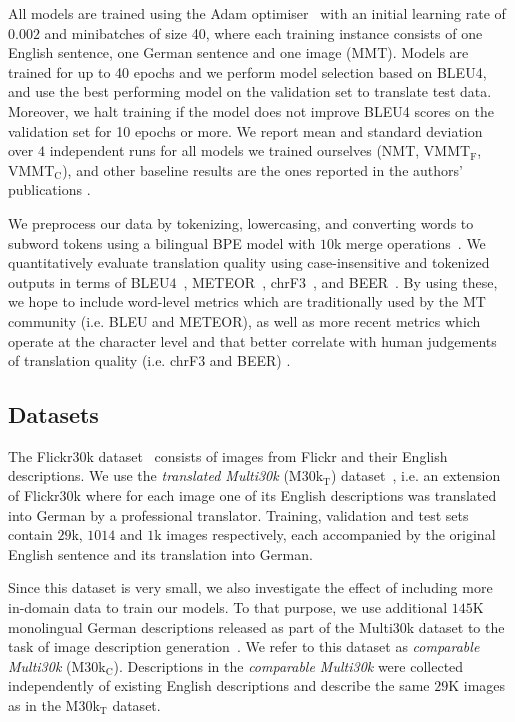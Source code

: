 \documentclass[11pt,a4paper]{article}
\newcommand{\cond}{VMMT$_{\text{C}}$\xspace}
\newcommand{\uncond}{VMMT$_{\text{F}}$\xspace}
\begin{document}
All models are trained using the Adam optimiser~\cite{KingmaBa2014} with an initial learning rate of $0.002$ and minibatches of size 40, where each training instance consists of one English sentence, one German sentence and one image (MMT).
Models are trained for up to 40 epochs and we perform model selection based on BLEU4, and use the best performing model on the validation set to translate test data.
Moreover, we halt training if the model does not improve BLEU4 scores on the validation set for 10 epochs or more.
We report mean and standard deviation over $4$ independent runs for all models we trained ourselves (NMT, \uncond, \cond), and other baseline results are the ones reported in the authors' publications \citep{Toyamaetal2016,ElliottKadar2017}.

We preprocess our data by tokenizing, lowercasing, and converting words to subword tokens using a bilingual BPE model with $10$k merge operations~\cite{Sennrichetal2016}.
We quantitatively evaluate translation quality using case-insensitive and tokenized outputs in terms of BLEU$4$~\cite{Papinenietal2002}, METEOR~\cite{DenkowskiLavie2014}, chrF3~\cite{Popovic2015}, and BEER~\cite{Stanojevic2014}.
By using these, we hope to include word-level metrics which are traditionally used by the MT community (i.e. BLEU and METEOR), as well as more recent metrics which operate at the character level and that better correlate with human judgements of translation quality (i.e. chrF3 and BEER) \citep{Bojaretal2017}.




\subsection{Datasets}\label{sec:data}
The Flickr30k dataset~\cite{Youngetal2014} consists of images from Flickr and their English descriptions.
We use the \emph{translated Multi30k} (M30k$_\text{T}$) dataset~\citep{ElliottFrankSimaanSpecia2016}, i.e. an extension of Flickr30k where for each image one of its English descriptions was translated into German by a professional translator. Training, validation and test sets contain $29$k, $1014$ and $1$k images respectively, each accompanied by the original English sentence and its translation into German.

Since this dataset is very small, we also investigate the effect of including more in-domain data to train our models.
To that purpose, we use additional $145$K monolingual German descriptions released as part of the Multi30k dataset to the task of image description generation~\citep{ElliottFrankSimaanSpecia2016}.
We refer to this dataset as \emph{comparable Multi30k} (M30k$_\text{C}$).
Descriptions in the \emph{comparable Multi30k} were collected independently of existing English descriptions and describe the same $29$K images as in the M30k$_\text{T}$ dataset.
\end{document}
